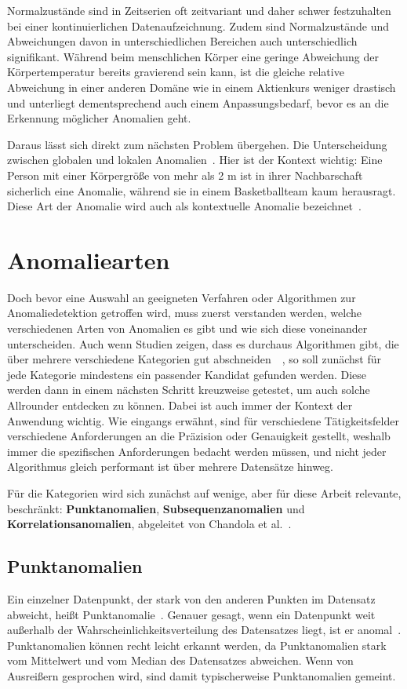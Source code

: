 Normalzustände sind in Zeitserien oft zeitvariant und daher schwer festzuhalten bei einer kontinuierlichen Datenaufzeichnung.
Zudem sind Normalzustände und Abweichungen davon in unterschiedlichen Bereichen auch unterschiedlich signifikant. Während beim
menschlichen Körper eine geringe Abweichung der Körpertemperatur bereits gravierend sein kann, ist die gleiche relative Abweichung
in einer anderen Domäne wie in einem Aktienkurs weniger drastisch und unterliegt dementsprechend auch einem Anpassungsbedarf, bevor
es an die Erkennung möglicher Anomalien geht.

Daraus lässt sich direkt zum nächsten Problem übergehen. Die Unterscheidung zwischen globalen und lokalen Anomalien~\cite{Breunig2000}.
Hier ist der Kontext wichtig: Eine Person mit einer Körpergröße von mehr als 2 m ist in ihrer Nachbarschaft sicherlich eine Anomalie,
während sie in einem Basketballteam kaum herausragt. Diese Art der Anomalie wird auch als kontextuelle
Anomalie bezeichnet~\Cite[S.~12]{Wenig2024}.

\section{Anomaliearten}\label{sec:anomaliearten}
Doch bevor eine Auswahl an geeigneten Verfahren oder Algorithmen zur Anomaliedetektion getroffen wird, muss zuerst verstanden werden,
welche verschiedenen Arten von Anomalien es gibt und wie sich diese voneinander unterscheiden.
Auch wenn Studien zeigen, dass es durchaus Algorithmen gibt, die über mehrere verschiedene Kategorien gut
abschneiden~\cite[S.~30~-~31]{Wenig2024}~\cite{Schmidl2022}, so soll zunächst für jede Kategorie mindestens ein passender Kandidat
gefunden werden. Diese werden dann in einem nächsten Schritt kreuzweise getestet, um auch solche Allrounder entdecken zu können. Dabei
ist auch immer der Kontext der Anwendung wichtig. Wie eingangs erwähnt, sind für verschiedene Tätigkeitsfelder verschiedene
Anforderungen an die Präzision oder Genauigkeit gestellt, weshalb immer die spezifischen Anforderungen bedacht werden müssen, und nicht
jeder Algorithmus gleich performant ist über mehrere Datensätze hinweg.

Für die Kategorien wird sich zunächst auf wenige, aber für diese Arbeit relevante, beschränkt: \textbf{Punkt\-anomalien},
\textbf{Subsequenzanomalien} und \textbf{Korrelationsanomalien}, abgeleitet von Chandola et al.~\cite{Chandola2009}.

\subsection{Punktanomalien}\label{sec:punktanomalien}
Ein einzelner Datenpunkt, der stark von den anderen Punkten im Datensatz abweicht, heißt Punkt\-anomalie~\cite{Chandola2009}. Genauer
gesagt, wenn ein Datenpunkt weit außerhalb der Wahrscheinlichkeitsverteilung des Datensatzes liegt, ist er anomal~\Cite[Kap.~10]{Tan2014}.
Punktanomalien können recht leicht erkannt werden, da Punktanomalien stark vom Mittelwert und vom Median des Datensatzes abweichen. Wenn
von Ausreißern gesprochen wird, sind damit typischerweise Punktanomalien gemeint.


